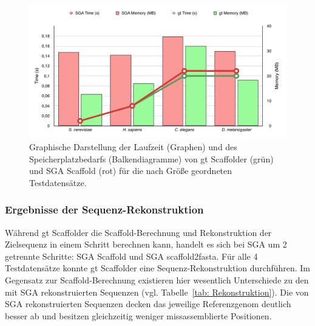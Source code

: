 \documentclass[a4paper,11pt,parskip,abstract=on]{scrartcl}
\begin{document}
\begin{figure}[t]
  \includegraphics[width=\textwidth,height=0.8\textheight,keepaspectratio]{presentation/figures/sga_vs_gt.pdf}
  \caption{\label{abb: Zeit}Graphische Darstellung der Laufzeit (Graphen) und
  des Speicherplatzbedarfs (Balkendiagramme) von gt Scaffolder (grün) und SGA
  Scaffold (rot) für die nach Größe geordneten Testdatensätze.}
\end{figure}


\subsubsection*{Ergebnisse der Sequenz-Rekonstruktion}
\label{sec: Seq-Rek}
Während gt Scaffolder die Scaffold-Berechnung und Rekonstruktion der
Zielsequenz in einem Schritt berechnen kann, handelt es sich bei SGA
um 2 getrennte Schritte: SGA Scaffold und SGA scaffold2fasta. Für alle
4 Testdatensätze konnte gt Scaffolder eine Sequenz-Rekonstruktion
durchführen. Im Gegensatz zur Scaffold-Berechnung existieren hier
wesentlich Unterschiede zu den mit SGA rekonstruierten Sequenzen
(vgl. Tabelle~\ref{tab: Rekonstruktion}). Die von SGA rekonstruierten
Sequenzen decken das jeweilige Referenzgenom deutlich besser ab und
besitzen gleichzeitig weniger missassemblierte Positionen.
\end{document}
